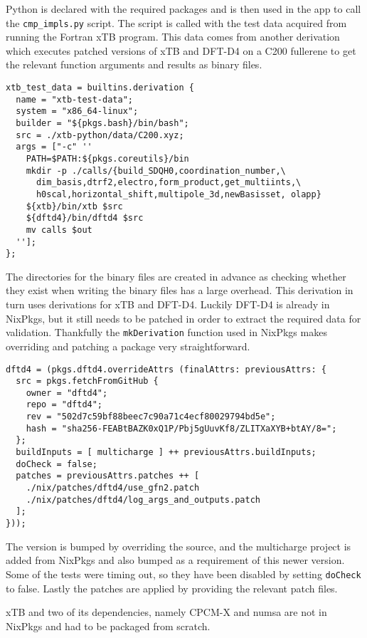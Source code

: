 Python is declared with the required packages and is then used in the app to call the \verb|cmp_impls.py| script. The script is called with the test data acquired from running the Fortran xTB program. This data comes from another derivation which executes patched versions of xTB and DFT-D4 on a C200 fullerene to get the relevant function arguments and results as binary files.

\begin{verbatim}
xtb_test_data = builtins.derivation {
  name = "xtb-test-data";
  system = "x86_64-linux";
  builder = "${pkgs.bash}/bin/bash";
  src = ./xtb-python/data/C200.xyz;
  args = ["-c" ''
    PATH=$PATH:${pkgs.coreutils}/bin
    mkdir -p ./calls/{build_SDQH0,coordination_number,\
      dim_basis,dtrf2,electro,form_product,get_multiints,\
      h0scal,horizontal_shift,multipole_3d,newBasisset, olapp}
    ${xtb}/bin/xtb $src
    ${dftd4}/bin/dftd4 $src
    mv calls $out
  ''];
};
\end{verbatim}

The directories for the binary files are created in advance as checking whether they exist when writing the binary files has a large overhead.
This derivation in turn uses derivations for xTB and DFT-D4. Luckily DFT-D4 is already in NixPkgs, but it still needs to be patched in order to extract the required data for validation. Thankfully the \verb|mkDerivation| function used in NixPkgs makes overriding and patching a package very straightforward. 

\begin{verbatim}
dftd4 = (pkgs.dftd4.overrideAttrs (finalAttrs: previousAttrs: {
  src = pkgs.fetchFromGitHub {
    owner = "dftd4";
    repo = "dftd4";
    rev = "502d7c59bf88beec7c90a71c4ecf80029794bd5e";
    hash = "sha256-FEABtBAZK0xQ1P/Pbj5gUuvKf8/ZLITXaXYB+btAY/8=";
  };
  buildInputs = [ multicharge ] ++ previousAttrs.buildInputs;
  doCheck = false;
  patches = previousAttrs.patches ++ [
    ./nix/patches/dftd4/use_gfn2.patch
    ./nix/patches/dftd4/log_args_and_outputs.patch
  ];
}));
\end{verbatim}

The version is bumped by overriding the source, and the multicharge project is added from NixPkgs and also bumped as a requirement of this newer version. Some of the tests were timing out, so they have been disabled by setting \verb|doCheck| to false. Lastly the patches are applied by providing the relevant patch files.


xTB and two of its dependencies, namely CPCM-X and numsa are not in NixPkgs and had to be packaged from scratch.

